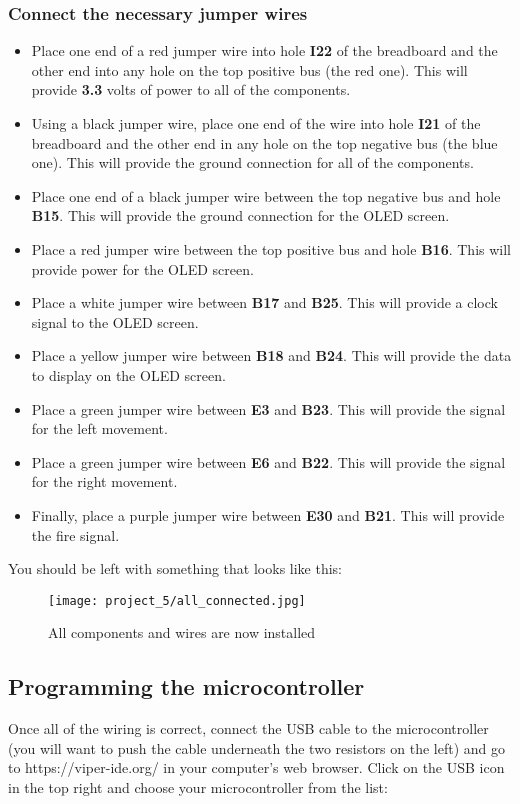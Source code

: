 \subsubsection{Connect the necessary jumper wires}
\begin{itemize}
    \item Place one end of a red jumper wire into hole \textbf{I22} of the breadboard and the other end into
    any hole on the top positive bus (the red one). This will provide \textbf{3.3} volts of power to all of the components.
    \item Using a black jumper wire, place one end of the wire into hole \textbf{I21} of the breadboard and the other
    end in any hole on the top negative bus (the blue one). This will provide the ground connection for all of the components.
    \item Place one end of a black jumper wire between the top negative bus and hole \textbf{B15}. This will provide the ground connection
    for the OLED screen.
    \item Place a red jumper wire between the top positive bus and hole \textbf{B16}. This will provide power for the OLED screen.
    \item Place a white jumper wire between \textbf{B17} and \textbf{B25}. This will provide a clock signal to the OLED screen.
    \item Place a yellow jumper wire between \textbf{B18} and \textbf{B24}. This will provide the data to display on the OLED screen.
    \item Place a green jumper wire between \textbf{E3} and \textbf{B23}. This will provide the signal for the left movement.
    \item Place a green jumper wire between \textbf{E6} and \textbf{B22}. This will provide the signal for the right movement.
    \item Finally, place a purple jumper wire between \textbf{E30} and \textbf{B21}. This will provide the fire signal.
\end{itemize}

You should be left with something that looks like this:
\begin{figure}[H]
    \centering
    \texttt{[image: project\_5/all\_connected.jpg]}
    \caption{All components and wires are now installed}
\end{figure}

\subsection{Programming the microcontroller}
Once all of the wiring is correct, connect the USB cable to the microcontroller (you will want to push the cable underneath the
two resistors on the left) and go to https://viper-ide.org/ in your computer's web browser. Click on the USB icon in the top
right and choose your microcontroller from the list:

